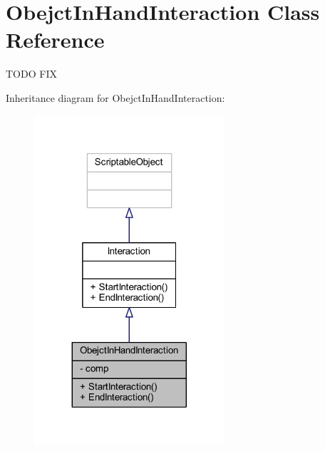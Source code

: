 \hypertarget{class_obejct_in_hand_interaction}{}\section{Obejct\+In\+Hand\+Interaction Class Reference}
\label{class_obejct_in_hand_interaction}


T\+O\+DO F\+IX  




Inheritance diagram for Obejct\+In\+Hand\+Interaction\+:
\nopagebreak
\begin{figure}[H]
\begin{center}
\leavevmode
\includegraphics[width=200pt]{class_obejct_in_hand_interaction__inherit__graph}
\end{center}
\end{figure}


